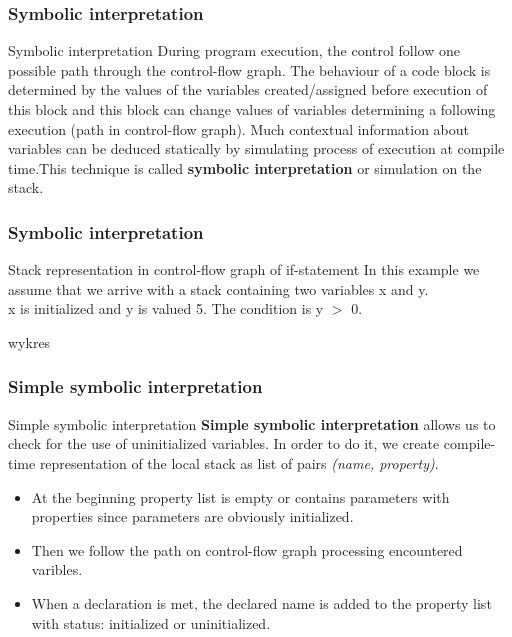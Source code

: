 \documentclass[presentation]{beamer}
\begin{document}
\begin{frame}
  \frametitle{Symbolic interpretation}
  
  \begin{block}{Symbolic interpretation}
  During program execution, the control follow one possible path through the control-flow graph. The behaviour of a code block is determined by the values of the variables created/assigned before execution of this block and this block can change values of variables determining a following execution (path in control-flow graph). Much contextual information about variables can be deduced statically by
  simulating process of execution at compile
  time.This technique is called \textbf{symbolic interpretation} or simulation on the stack.
  \end{block}
  
\end{frame}

\begin{frame}
  \frametitle{Symbolic interpretation}
  \begin{block}{Stack representation in control-flow graph of if-statement}
  In this example we assume that we arrive with a stack containing two variables x and y.\\
  x is initialized and y is valued 5. The condition is y $>$ 0.
  \end{block}
  wykres
\end{frame}

\begin{frame}
  \frametitle{Simple symbolic interpretation}
  
  \begin{block}{Simple symbolic interpretation}
  \textbf{Simple symbolic interpretation} allows us to check for the use of uninitialized variables. In order to do it, we create compile-time representation of the local stack as list of pairs \emph{(name, property)}. 
  \begin{itemize}
    \item At the beginning property list is empty or contains parameters with properties since parameters are obviously initialized.
    \item Then we follow the path on control-flow graph processing encountered varibles.
    \item When a declaration is met, the declared name is added to the property list with status: initialized or uninitialized.
    
    \end{itemize}
 
  \end{block}
  
\end{frame}
\end{document}
